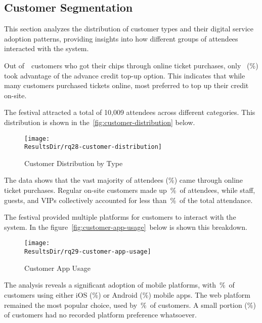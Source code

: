 
\subsection{Customer Segmentation}
\label{subsec:analysis-customer-segmentation}

This section analyzes the distribution of customer types and their digital service adoption patterns, providing insights into how different groups of attendees interacted with the system.


Out of~~customers who got their chips through online ticket purchases, only ~(\%) took advantage of the advance credit top-up option.
This indicates that while many customers purchased tickets online, most preferred to top up their credit on-site.


The festival attracted a total of 10,009 attendees across different categories.
This distribution is shown in the~\autoref{fig:customer-distribution} below.

\begin{figure}[H]
	\centering
	\texttt{[image: \\ResultsDir/rq28-customer-distribution]}
	\caption{Customer Distribution by Type}
	\label{fig:customer-distribution}
	\source
\end{figure}

The data shows that the vast majority of attendees (\%) came through online ticket purchases.
Regular on-site customers made up~\%~of attendees, while staff, guests, and VIPs collectively accounted for less than~\%~of the total attendance.


The festival provided multiple platforms for customers to interact with the system.
In the figure~\autoref{fig:customer-app-usage}~below is shown this breakdown.

\begin{figure}[H]
	\centering
	\texttt{[image: \\ResultsDir/rq29-customer-app-usage]}
	\caption{Customer App Usage}
	\label{fig:customer-app-usage}
	\source
\end{figure}

The analysis reveals a significant adoption of mobile platforms, with~\%~of customers using either iOS (\%) or Android (\%) mobile apps.
The web platform remained the most popular choice, used by~\%~of customers.
A small portion (\%) of customers had no recorded platform preference whatsoever.

